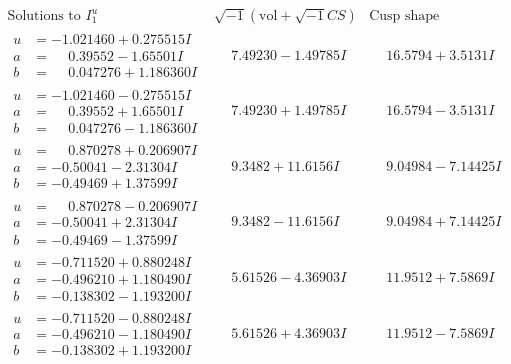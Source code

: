 \documentclass[1p]{elsarticle_modified}
\theoremstyle{definition}
\newcommand{\I}{\sqrt{-1}}
\begin{document}
$$\begin{array}{c|c|c}  
\text{Solutions to }I^u_{1}& \I (\text{vol} + \sqrt{-1}CS) & \text{Cusp shape}\\
 \hline 
\begin{aligned}
u &= -1.021460 + 0.275515 I \\
a &= \phantom{-}0.39552 - 1.65501 I \\
b &= \phantom{-}0.047276 + 1.186360 I\end{aligned}
 & \phantom{-}7.49230 - 1.49785 I & \phantom{-}16.5794 + 3.5131 I \\ \hline\begin{aligned}
u &= -1.021460 - 0.275515 I \\
a &= \phantom{-}0.39552 + 1.65501 I \\
b &= \phantom{-}0.047276 - 1.186360 I\end{aligned}
 & \phantom{-}7.49230 + 1.49785 I & \phantom{-}16.5794 - 3.5131 I \\ \hline\begin{aligned}
u &= \phantom{-}0.870278 + 0.206907 I \\
a &= -0.50041 - 2.31304 I \\
b &= -0.49469 + 1.37599 I\end{aligned}
 & \phantom{-}9.3482 + 11.6156 I & \phantom{-}9.04984 - 7.14425 I \\ \hline\begin{aligned}
u &= \phantom{-}0.870278 - 0.206907 I \\
a &= -0.50041 + 2.31304 I \\
b &= -0.49469 - 1.37599 I\end{aligned}
 & \phantom{-}9.3482 - 11.6156 I & \phantom{-}9.04984 + 7.14425 I \\ \hline\begin{aligned}
u &= -0.711520 + 0.880248 I \\
a &= -0.496210 + 1.180490 I \\
b &= -0.138302 - 1.193200 I\end{aligned}
 & \phantom{-}5.61526 - 4.36903 I & \phantom{-}11.9512 + 7.5869 I \\ \hline\begin{aligned}
u &= -0.711520 - 0.880248 I \\
a &= -0.496210 - 1.180490 I \\
b &= -0.138302 + 1.193200 I\end{aligned}
 & \phantom{-}5.61526 + 4.36903 I & \phantom{-}11.9512 - 7.5869 I \\ \hline\begin{aligned}

\end{aligned}
\end{array}$$
\end{document}
